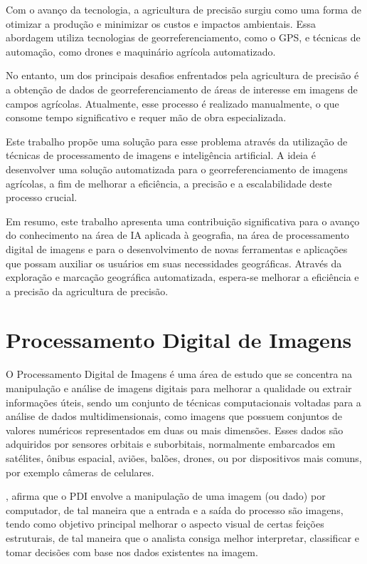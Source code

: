 \documentclass[conference]{IEEEtran}
\begin{document}
Com o avanço da tecnologia, a agricultura de precisão surgiu como uma forma de otimizar a produção e 
minimizar os custos e impactos ambientais. Essa abordagem utiliza tecnologias de georreferenciamento, como o GPS, 
e técnicas de automação, como drones e maquinário agrícola automatizado.

No entanto, um dos principais desafios enfrentados pela agricultura de precisão é a obtenção de dados de 
georreferenciamento de áreas de interesse em imagens de campos agrícolas. 
Atualmente, esse processo é realizado manualmente, 
o que consome tempo significativo e requer mão de obra especializada.

Este trabalho propõe uma solução para esse problema através da utilização de técnicas de 
processamento de imagens e inteligência artificial. A ideia é desenvolver uma solução automatizada para o 
georreferenciamento de imagens agrícolas, a fim de melhorar a eficiência, a precisão e a escalabilidade deste 
processo crucial.

Em resumo, este trabalho apresenta uma contribuição significativa para o avanço do conhecimento na área de IA 
aplicada à geografia, na área de processamento digital de imagens e para o desenvolvimento de novas ferramentas 
e aplicações que possam auxiliar os usuários 
em suas necessidades geográficas. Através da exploração e marcação geográfica automatizada, espera-se melhorar 
a eficiência e a precisão da agricultura de precisão.

\section{Processamento Digital de Imagens}

O Processamento Digital de Imagens é uma área de estudo que se concentra na manipulação e análise de imagens 
digitais para melhorar a qualidade ou extrair informações úteis, sendo um conjunto de técnicas computacionais 
voltadas para a análise de dados multidimensionais, como imagens que possuem conjuntos de valores numéricos 
representados em duas ou mais dimensões. Esses dados são adquiridos por sensores orbitais e suborbitais, 
normalmente embarcados em satélites, ônibus espacial, aviões, balões, drones, ou por dispositivos mais comuns, 
por exemplo câmeras de celulares. 

\cite{gonzalez2009}, afirma que o PDI envolve a manipulação de uma imagem (ou dado) por computador, 
de tal maneira que a entrada e a saída do processo são imagens, tendo como objetivo principal melhorar o 
aspecto visual de certas feições estruturais, de tal maneira que o analista consiga melhor interpretar, 
classificar e tomar decisões com base nos dados existentes na imagem.
\end{document}
